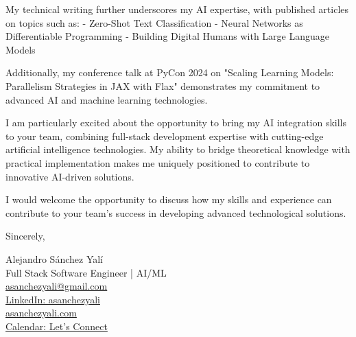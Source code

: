 \documentclass[11pt]{letter}
\begin{document}
\begin{letter}{}
My technical writing further underscores my AI expertise, with published articles on topics such as:
- Zero-Shot Text Classification
- Neural Networks as Differentiable Programming
- Building Digital Humans with Large Language Models

Additionally, my conference talk at PyCon 2024 on "Scaling Learning Models: Parallelism Strategies in JAX with Flax" demonstrates my commitment to advanced AI and machine learning technologies.

I am particularly excited about the opportunity to bring my AI integration skills to your team, combining full-stack development expertise with cutting-edge artificial intelligence technologies. My ability to bridge theoretical knowledge with practical implementation makes me uniquely positioned to contribute to innovative AI-driven solutions.

I would welcome the opportunity to discuss how my skills and experience can contribute to your team's success in developing advanced technological solutions.

\closing{Sincerely,}

\vspace{12pt}
Alejandro Sánchez Yalí\\
Full Stack Software Engineer | AI/ML\\
\href{mailto:asanchezyali@gmail.com}{asanchezyali@gmail.com}\\
\href{https://www.linkedin.com/in/asanchezyali}{LinkedIn: asanchezyali}\\
\href{https://asanchezyali.com}{asanchezyali.com}\\
\href{https://cal.com/asanchezyali/full-time-opportunities}{Calendar: Let's Connect}
\end{letter}
\end{document}
